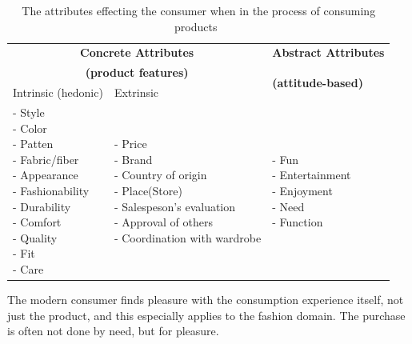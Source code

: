 \begin{table}[H]
    \centering
    \begin{tabular}{l|l|l}
      \multicolumn{2}{c|}{\textbf{Concrete Attributes}} & \textbf{Abstract Attributes} \\
      \multicolumn{2}{c|}{\textbf{(product features)}} & \multirow{2}{*}{\textbf{(attitude-based)}} \\ \cline{1-2}
      Intrinsic (hedonic)   & Extrinsic & \\ \hline
      \pbox{4cm}{
          - Style \\
          - Color \\
          - Patten \\
          - Fabric/fiber \\
          - Appearance \\
          - Fashionability \\
          - Durability \\
          - Comfort \\
          - Quality \\
          - Fit \\
          - Care \\
      } & \pbox{6cm}{
          - Price \\
          - Brand \\
          - Country of origin \\
          - Place(Store) \\
          - Salespeson's evaluation \\
          - Approval of others \\
          - Coordination with wardrobe \\
      } & \pbox{4cm}{
          - Fun \\
          - Entertainment \\
          - Enjoyment \\
          - Need \\
          - Function \\
        } \\ \hline
    \end{tabular}
    \label{table:ConsumersPurchaseDec}
    \caption [Consumers' Purchase Decisions]{The attributes effecting the consumer when in the process of consuming products~\cite{dutton2006}}
\end{table}

The modern consumer finds pleasure with the consumption experience itself, not just the product, and this especially applies to the fashion domain.
The purchase is often not done by need, but for pleasure.

